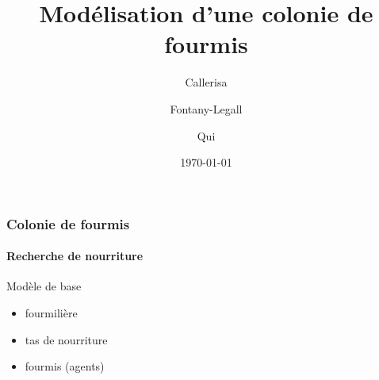 \documentclass[11pt]{beamer}
\author{Callerisa \and Fontany-Legall \and Qui}
\title{Modélisation d'une colonie de fourmis}
\institute{Université de Nice}
\date{\today}
\begin{document}
\begin{frame}
\titlepage
\end{frame}

\begin{frame}{1}
\frametitle{Colonie de fourmis}
\framesubtitle{Recherche de nourriture}
\begin{block}{Modèle de base}
\begin{itemize}
\item fourmilière
\item tas de nourriture
\item fourmis (agents)
\end{itemize}
\end{block}


\end{frame}
\end{document}
